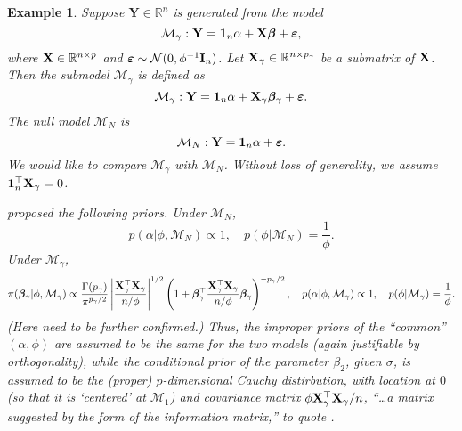 \documentclass[11pt]{article}
\newcommand{\BY}{\mathbf{Y}}    \newcommand{\BZ}{\mathbf{Z}}
\newcommand{\bfsym}[1]{\ensuremath{\boldsymbol{#1}}}
\def\bbeta{\bfsym \beta}
\theoremstyle{plain}
\newtheorem{example}{Example}
\theoremstyle{definition}
\theoremstyle{remark}
\begin{document}
\begin{example}

Suppose $\BY\in \mathbb R^n$ is generated from the model
\begin{equation*}
    \mathcal M_{\gamma}: \BY=\mathbf 1_n \alpha + \BX \bbeta+\bepsilon,
\end{equation*}
where $\mathbf{X} \in \mathbb R^{n\times p}$ and $\bepsilon\sim \mathcal N (0, \phi^{-1} \BI_n)$.
Let $\mathbf{X}_{\gamma}\in \mathbb R^{n\times p_{\gamma}}$ be a submatrix of $\mathbf{X}$.
Then the submodel $\mathcal M_\gamma$ is defined as 
\begin{equation*}
    \mathcal M_{\gamma}: \BY=\mathbf 1_n \alpha + \BX_\gamma \bbeta_{\gamma}+\bepsilon.
\end{equation*}
The null model $\mathcal M_N $ is 
\begin{equation*}
    \mathcal M_{N}: \BY=\mathbf 1_n \alpha +\bepsilon.
\end{equation*}
We would like to compare $\mathcal M_\gamma$ with $\mathcal M_N$.
Without loss of generality, we assume $\mathbf 1_n^\top \mathbf{X}_\gamma=0$.
    
\cite{Zellner1980} proposed the following priors.
Under $\mathcal M_N$, 
\begin{equation*}
    p(\alpha|\phi,\mathcal M_N) \propto 1,
\quad
    p(\phi|\mathcal M_N) = \frac{1}{\phi}.
\end{equation*}
Under $\mathcal M_\gamma$, 
\begin{equation*}
    \pi(\bbeta_\gamma | \phi,\mathcal M_\gamma)
    \propto
    \frac{\Gamma(p_{\gamma})}{\pi^{p_\gamma/2}}
    \left|
    \frac{\BX_\gamma^\top \BX_\gamma}{n/\phi}
    \right|^{1/2}
    \left(
        1+\bbeta_\gamma^\top \frac{\BX_\gamma^\top \BX_\gamma}{n/\phi}   \bbeta_\gamma
    \right)^{-p_\gamma/2}
    ,
    \quad p(\alpha|\phi,\mathcal M_\gamma)\propto 1,
    \quad p(\phi|\mathcal M_\gamma) = \frac{1}{\phi}.
\end{equation*}
(Here need to be further confirmed.)
Thus, the improper priors of the ``common'' $(\alpha,\phi)$ are assumed to be the same for the two models (again justifiable by orthogonality), while the conditional prior of the parameter $\beta_2$, given $\sigma$, is assumed to be the (proper) $p$-dimensional Cauchy distirbution, with location at $0$ (so that it is `centered' at $\mathcal M_1$) and covariance matrix $\phi \mathbf{X}_\gamma^\top \mathbf{X}_\gamma/n$, ``\dots a matrix suggested by the form of the information matrix,'' to quote
\cite{Zellner1980}.

\end{example}
\end{document}
